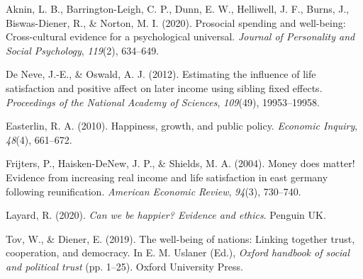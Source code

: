 \documentclass[
  12pt,
]{article}
\newlength{\cslhangindent}
\newlength{\cslentryspacingunit} %
\newenvironment{CSLReferences}[2] %
 {%
  \setlength{\parindent}{0pt}
  \ifodd #1
  \let\oldpar\par
  \def\par{\hangindent=\cslhangindent\oldpar}
  \fi
  \setlength{\parskip}{#2\cslentryspacingunit}
 }%
 {}
\begin{document}
\hypertarget{refs}{}
\begin{CSLReferences}{1}{0}
\leavevmode{}%
Aknin, L. B., Barrington-Leigh, C. P., Dunn, E. W., Helliwell, J. F., Burns, J., Biswas-Diener, R., \& Norton, M. I. (2020). Prosocial spending and well-being: Cross-cultural evidence for a psychological universal. \emph{Journal of Personality and Social Psychology}, \emph{119}(2), 634--649.

\leavevmode{}%
De Neve, J.-E., \& Oswald, A. J. (2012). Estimating the influence of life satisfaction and positive affect on later income using sibling fixed effects. \emph{Proceedings of the National Academy of Sciences}, \emph{109}(49), 19953--19958.

\leavevmode{}%
Easterlin, R. A. (2010). Happiness, growth, and public policy. \emph{Economic Inquiry}, \emph{48}(4), 661--672.

\leavevmode{}%
Frijters, P., Haisken-DeNew, J. P., \& Shields, M. A. (2004). Money does matter! Evidence from increasing real income and life satisfaction in east germany following reunification. \emph{American Economic Review}, \emph{94}(3), 730--740.

\leavevmode{}%
Layard, R. (2020). \emph{Can we be happier? Evidence and ethics}. Penguin UK.

\leavevmode{}%
Tov, W., \& Diener, E. (2019). The well-being of nations: Linking together trust, cooperation, and democracy. In E. M. Uslaner (Ed.), \emph{Oxford handbook of social and political trust} (pp. 1--25). Oxford University Press.

\end{CSLReferences}
\end{document}

